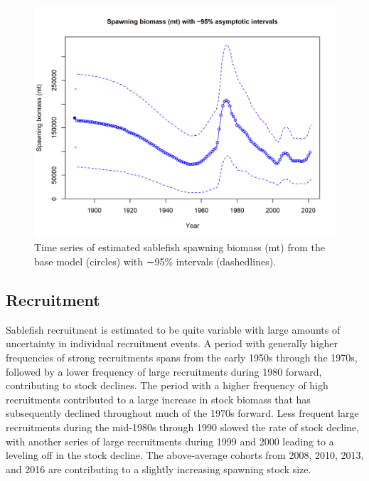 \documentclass[11pt,
  english,
  a4paper,
]{article}
\begin{document}
\begin{figure}
\centering
\includegraphics[width=1\textwidth,height=1\textheight]{figs/ts7_Spawning_biomass_mt_with_95_asymptotic_intervals_intervals.png}
\caption{Time series of estimated sablefish spawning biomass (mt) from the base model (circles) with ∼95\% intervals (dashedlines).}
\end{figure}

\tagmcend\tagstructend

\quad


\hypertarget{recruitment}{%
\subsection*{Recruitment}\label{recruitment}}

\leavevmode\tagmcend\tagstructend


Sablefish recruitment is estimated to be quite variable with large amounts of uncertainty in individual recruitment events. A period with generally higher frequencies of strong recruitments spans from the early 1950s through the 1970s, followed by a lower frequency of large recruitments during 1980 forward, contributing to stock declines. The period with a higher frequency of high recruitments contributed to a large increase in stock biomass that has subsequently declined throughout much of the 1970s forward. Less frequent large recruitments during the mid-1980s through 1990 slowed the rate of stock decline, with another series of large recruitments during 1999 and 2000 leading to a leveling off in the stock decline. The above-average cohorts from 2008, 2010, 2013, and 2016 are contributing to a slightly increasing spawning stock size.
\end{document}
